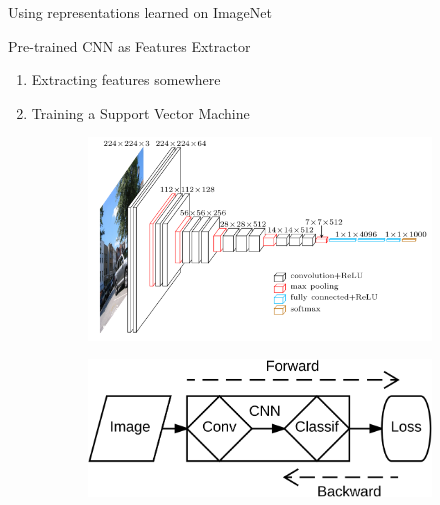 \begin{frame}{Using representations learned on ImageNet}
	
	\begin{block}{\small Pre-trained CNN as Features Extractor}
		\vspace{-.2cm}
	\begin{enumerate}
		\item Extracting features somewhere
		\item Training a Support Vector Machine
	\end{enumerate}
	\end{block}
	
		\vspace{-.2cm}
		
	\begin{figure}
		\centering
		\begin{subfigure}{.59\textwidth}
			\centering
			\includegraphics[width=.99\linewidth]{images/vgg16.png}
			\label{fig:dsg1}
		\end{subfigure}%
		\begin{subfigure}{.39\textwidth}
			\centering
			\includegraphics[width=.99\linewidth]{images/Extraction.png}
			\label{fig:dsg2}
		\end{subfigure}
		\label{fig:dsgimages}
	\end{figure}	
	

\end{frame}


